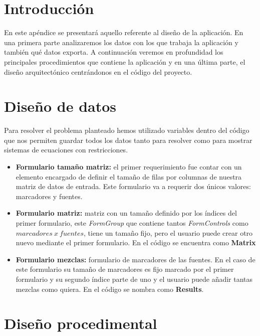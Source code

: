 
\section{Introducción}

En este apéndice se presentará aquello referente al diseño de la aplicación. En una primera parte analizaremos los datos con los que trabaja la aplicación y también qué datos exporta. A continuación veremos en profundidad los principales procedimientos que contiene la aplicación y en una última parte, el diseño arquitectónico centrándonos en el código del proyecto.

\section{Diseño de datos}

Para resolver el problema planteado hemos utilizado variables dentro del código que nos permiten guardar todos los datos tanto para resolver como para mostrar sistemas de ecuaciones con restricciones.

\begin{itemize}
    \item \textbf{Formulario tamaño matriz: }el primer requerimiento fue contar con un elemento encargado de definir el tamaño de filas por columnas de nuestra matriz de datos de entrada. Este formulario va a requerir dos únicos valores: marcadores y fuentes.
    
    \item \textbf{Formulario matriz:} matriz con un tamaño definido por los índices del primer formulario, este \textit{FormGroup} que contiene tantos \textit{FormControls} como $marcadores\:x\:fuentes$, tiene un tamaño fijo, pero el usuario puede crear otro nuevo mediante el primer formulario. En el código se encuentra como \textbf{Matrix}
    
    \item \textbf{Formulario mezclas: }formulario de marcadores de las fuentes. En el caso de este formulario su tamaño de marcadores es fijo marcado por el primer formulario y su segundo índice parte de uno y el usuario puede añadir tantas mezclas como quiera. En el código se nombra como \textbf{Results}.
\end{itemize}

\section{Diseño procedimental}


